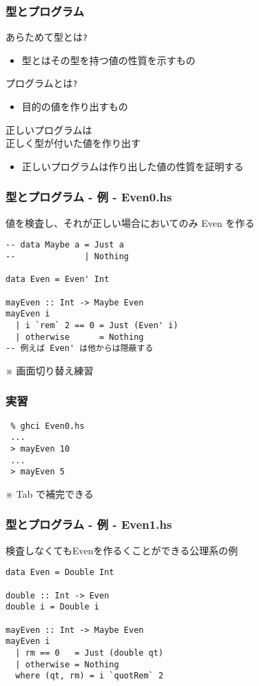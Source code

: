 \documentclass[cjk,dvipdfm,14pt]{beamer}
\begin{document}
\begin{frame}[fragile]
\frametitle{型とプログラム}

あらためて型とは\verb|?|
\begin{itemize}
\item 型とはその型を持つ値の性質を示すもの
\end{itemize}

プログラムとは\verb|?|
\begin{itemize}
\item 目的の値を作り出すもの
\end{itemize}

正しいプログラムは\\正しく型が付いた値を作り出す
\begin{itemize}
\item { \color{red} 正しいプログラムは作り出した値の性質を証明する }
\end{itemize}

\end{frame}

\begin{frame}[fragile]
\frametitle{型とプログラム - 例 - Even0.hs}

値を検査し、それが正しい場合においてのみ Even を作る
\begin{lstlisting}
-- data Maybe a = Just a
--              | Nothing

data Even = Even' Int

mayEven :: Int -> Maybe Even
mayEven i
  | i `rem` 2 == 0 = Just (Even' i)
  | otherwise      = Nothing
-- 例えば Even' は他からは隠蔽する
\end{lstlisting}

\end{frame}

\begin{frame}[fragile]
※ 画面切り替え練習
\end{frame}

\begin{frame}[fragile]
\frametitle{実習}

\begin{lstlisting}
 % ghci Even0.hs
 ...
 > mayEven 10
 ...
 > mayEven 5
\end{lstlisting}
※ Tab で補完できる

\end{frame}

\begin{frame}[fragile]
\frametitle{型とプログラム - 例 - Even1.hs}

検査しなくてもEvenを作るくことができる公理系の例
\begin{lstlisting}
data Even = Double Int

double :: Int -> Even
double i = Double i

mayEven :: Int -> Maybe Even
mayEven i
  | rm == 0   = Just (double qt)
  | otherwise = Nothing
  where (qt, rm) = i `quotRem` 2
\end{lstlisting}

\end{frame}
\end{document}
